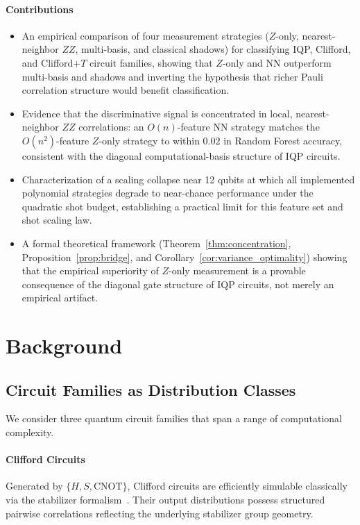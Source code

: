 \documentclass[conference]{IEEEtran}
\newcommand{\nqubits}{n}
\begin{document}
\paragraph*{Contributions}
\begin{itemize}
    \item An empirical comparison of four measurement strategies ($Z$-only, nearest-neighbor $ZZ$, multi-basis, and classical shadows) for classifying IQP, Clifford, and Clifford$+T$ circuit families, showing that $Z$-only and NN outperform multi-basis and shadows and inverting the hypothesis that richer Pauli correlation structure would benefit classification.
    \item Evidence that the discriminative signal is concentrated in local, nearest-neighbor $ZZ$ correlations: an $O(\nqubits)$-feature NN strategy matches the $O(\nqubits^2)$-feature $Z$-only strategy to within $0.02$ in Random Forest accuracy, consistent with the diagonal computational-basis structure of IQP circuits.
    \item Characterization of a scaling collapse near 12 qubits at which all implemented polynomial strategies degrade to near-chance performance under the quadratic shot budget, establishing a practical limit for this feature set and shot scaling law.
    \item A formal theoretical framework (Theorem~\ref{thm:concentration}, Proposition~\ref{prop:bridge}, and Corollary~\ref{cor:variance_optimality}) showing that the empirical superiority of $Z$-only measurement is a provable consequence of the diagonal gate structure of IQP circuits, not merely an empirical artifact.
\end{itemize}

\section{Background}
\label{sec:background}

\subsection{Circuit Families as Distribution Classes}

We consider three quantum circuit families that span a range of computational complexity.

\paragraph{Clifford Circuits}
Generated by $\{H, S, \mathrm{CNOT}\}$, Clifford circuits are efficiently simulable classically via the stabilizer formalism~\cite{gottesman1997stabilizer}.
Their output distributions possess structured pairwise correlations reflecting the underlying stabilizer group geometry.
\end{document}
